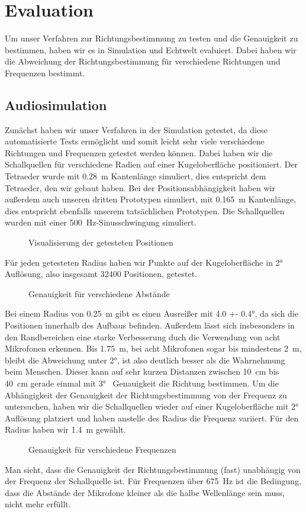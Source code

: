\section{Evaluation}
Um unser Verfahren zur Richtungsbestimmung zu testen und die Genauigkeit zu bestimmen, haben wir es in Simulation und Echtwelt evaluiert. Dabei haben wir die Abweichung der Richtungsbestimmung für verschiedene Richtungen und Frequenzen bestimmt.
\subsection{Audiosimulation}
Zunächst haben wir unser Verfahren in der Simulation getestet, da diese automatisierte Tests ermöglicht und somit leicht sehr viele verschiedene Richtungen und Frequenzen getestet werden können. Dabei haben wir die Schallquellen für verschiedene Radien auf einer Kugeloberfläche positioniert. Der Tetraeder wurde mit \SI{0.28}{\meter} Kantenlänge simuliert, dies entspricht dem Tetraeder, den wir gebaut haben. Bei der Positionsabhängigkeit haben wir außerdem auch unseren dritten Prototypen simuliert, mit \SI{0.165}{\meter} Kantenlänge, dies entspricht ebenfalls unserem tatsächlichen Prototypen. Die Schallquellen wurden mit einer \SI{500}{\hertz}-Sinusschwingung simuliert.
\begin{figure}[H]
  \centering
  \resizebox{0.850\textwidth}{!}{}
  \caption{Visualisierung der getesteten Positionen\label{fig:pos}}
\end{figure}
Für jeden getesteten Radius haben wir Punkte auf der Kugeloberfläche in \ang{2} Auflösung, also insgesamt \num{32400} Positionen, getestet.
\begin{figure}[H]
  \centering
  \resizebox{0.750\textwidth}{!}{}
  \caption{Genauigkeit für verschiedene Abstände\label{fig:pos_sweep}}
\end{figure}
Bei einem Radius von \SI{0.25}{\meter} gibt es einen Ausreißer mit \ang[separate-uncertainty = true]{4.0 +- 0.4}, da sich die Positionen innerhalb des Aufbaus befinden. Außerdem lässt sich insbesonders in den Randbereichen eine starke Verbesserung duch die Verwendung von acht Mikrofonen erkennen. Bis \SI{1.75}{\meter}, bei acht Mikrofonen sogar bis mindestens \SI{2}{\meter}, bleibt die Abweichung unter \ang{2}, ist also deutlich besser als die Wahrnehmung beim Menschen. Dieser kann auf sehr kurzen Distanzen zwischen \SI{10}{\centi\meter} bis \SI{40}{\centi\meter} gerade einmal mit \ang{3}~\cite{middlebrooks1991sound} Genauigkeit die Richtung bestimmen.
Um die Abhängigkeit der Genauigkeit der Richtungsbestimmung von der Frequenz zu untersuchen, haben wir die Schallquellen wieder auf einer Kugeloberfläche mit \ang{2} Auflösung platziert und haben anstelle des Radius die Frequenz variiert. Für den Radius haben wir \SI{1.4}{\meter} gewählt.
\begin{figure}[H]
  \centering
  
  \caption{Genauigkeit für verschiedene Frequenzen\label{fig:freq_seep}}
\end{figure}
Man sieht, dass die Genauigkeit der Richtungsbestimmung (fast) unabhängig von der Frequenz der Schallquelle ist. Für Frequenzen über \SI{675}{\hertz} ist die Bedingung, dass die Abstände der Mikrofone kleiner als die halbe Wellenlänge sein muss, nicht mehr erfüllt.
